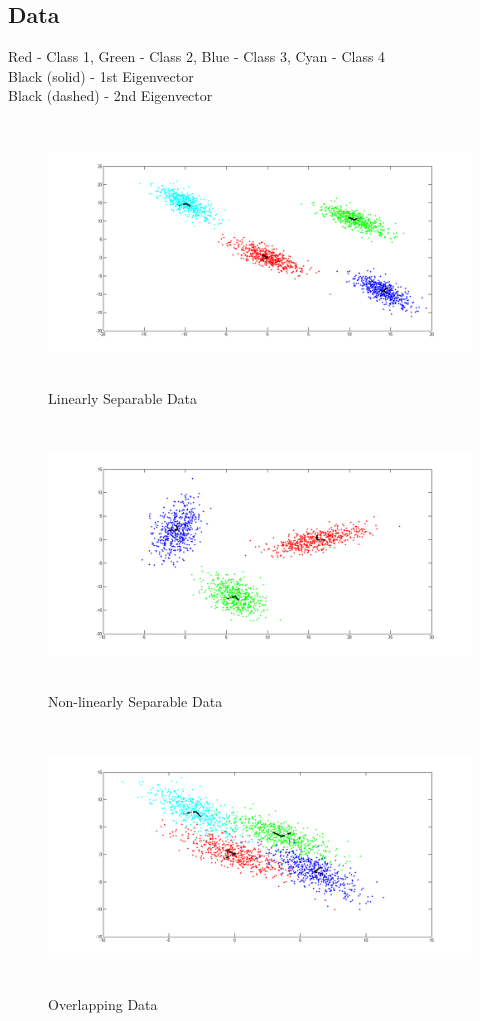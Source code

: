 \documentclass[11pt,a4paper]{article}
\begin{document}
\subsection{Data}
Red - Class 1, Green - Class 2, Blue - Class 3, Cyan - Class 4\\
Black (solid) - 1st Eigenvector\\
Black (dashed) - 2nd Eigenvector\\  
\begin{figure}[H]
		\centering
\includegraphics[height=7cm]{Figures/ls_eig.png}
\caption{Linearly Separable Data}
\end{figure}

\begin{figure}[H]
		\centering
\includegraphics[height=7cm]{Figures/NLS_eig.png}
\caption{Non-linearly Separable Data}
\end{figure}

\clearpage
\begin{figure}[H]
		\centering
\includegraphics[height=7cm]{Figures/OD_eig.png}
\caption{Overlapping Data}
\end{figure}
\end{document}

